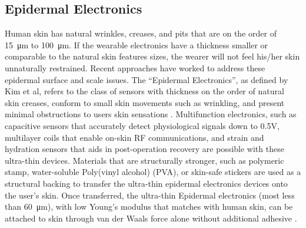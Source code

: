 \documentclass{sigchi}
\begin{document}


\subsection{Epidermal Electronics}
Human skin has natural wrinkles, creases, and pits that are on the order of \SI{15}{\micro\metre} to \SI{100}{\micro\metre}\cite{Tchvialeva:2014wla}. If the wearable electronics have a thickness smaller or comparable to the natural skin features sizes, the wearer will not feel his/her skin unnaturally restrained\cite{Kim:2011bv}. Recent approaches have worked to address these epidermal surface and scale issues. The “Epidermal Electronics”, as defined by Kim et al, refers to the class of sensors with thickness on the order of natural skin creases, conform to small skin movements such as wrinkling, and present minimal obstructions to users skin sensations \cite{Kim:2011bv}. Multifunction electronics, such as capacitive sensors that accurately detect physiological signals down to 0.5V, multilayer coils that enable on-skin RF communications, and strain and hydration sensors that aids in post-operation recovery\cite{Jeong:2013km,Kim:2014iq,Bandodkar:2014dl,Kim:2011bv} are possible with these ultra-thin devices. Materials that are structurally stronger, such as polymeric stamp, water-soluble Poly(vinyl alcohol) (PVA), or skin-safe stickers are used as a structural backing to transfer the ultra-thin epidermal electronics devices onto the user's skin\cite{Son:2014iya}. Once transferred, the ultra-thin Epidermal electronics (most less than \SI{60}{\micro\metre}), with low Young's modulus that matches with human skin, can be attached to skin through van der Waals force alone without additional adhesive \cite{Son:2014iya,Kim:2011bv}. 
\end{document}
